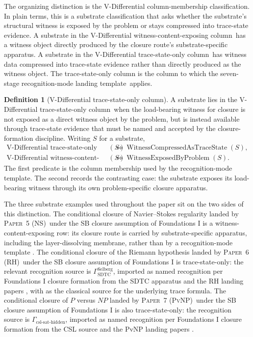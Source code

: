 \documentclass[11pt]{article}
\newcommand{\PaperNS}{\textsc{Paper~5 (NS)}}
\newcommand{\PaperRH}{\textsc{Paper~6 (RH)}}
\newcommand{\PaperPvNP}{\textsc{Paper~7 (PvNP)}}
\newcommand{\VDTSO}{V-Differential trace-state-only column}
\newcommand{\VDWCE}{V-Differential witness-content-exposing column}
\newcommand{\SevenStage}{seven-stage recognition-mode landing template}
\theoremstyle{definition}
\newtheorem{definition}[theorem]{Definition}
\begin{document}
The organizing distinction is the V-Differential column-membership
classification. In plain terms, this is a substrate classification that
asks whether the substrate's structural witness is exposed by the problem
or stays compressed into trace-state evidence. A substrate in the
\VDWCE\ has a witness object directly produced by the closure route's
substrate-specific apparatus. A substrate in the \VDTSO\ has witness data
compressed into trace-state evidence rather than directly produced as the
witness object. The trace-state-only column is the column to which the
\SevenStage\ applies.

\begin{definition}[V-Differential trace-state-only column]\label{def:vdiff-tso-column}
A substrate lies in the \VDTSO\ when the load-bearing witness for closure
is not exposed as a direct witness object by the problem, but is instead
available through trace-state evidence that must be named and accepted by
the closure-formation discipline.
Writing \(S\) for a substrate,
\[
\begin{aligned}
  \mbox{\VDTSO}(S)
    &\Longleftrightarrow
      \operatorname{WitnessCompressedAsTraceState}(S),\\
  \mbox{\VDWCE}(S)
    &\Longleftrightarrow
      \operatorname{WitnessExposedByProblem}(S).
\end{aligned}
\]
The first predicate is the column membership used by the
recognition-mode template.  The second records the contrasting case:
the substrate exposes its load-bearing witness through its own
problem-specific closure apparatus.
\end{definition}

The three substrate examples used throughout the paper sit on the two
sides of this distinction. The conditional closure of Navier--Stokes
regularity landed by \PaperNS\ under the SB closure assumption of
Foundations I is a witness-content-exposing row: its closure route is
carried by substrate-specific apparatus, including the layer-dissolving
membrane, rather than by a recognition-mode template
\cite{Tsiokos2026NavierStokes}. The conditional closure of the Riemann
hypothesis landed by \PaperRH\ under the SB closure assumption of
Foundations I is trace-state-only: the relevant recognition source is
\(\Gamma_{\mathrm{SDTC}}^{\mathrm{Selberg}}\), imported as named
recognition per Foundations I closure formation from the SDTC apparatus
and the RH landing papers \cite{Tsiokos2026SDTC,Tsiokos2026RH}, with
\cite{Selberg1956TraceFormula} as the classical source for the
underlying trace formula. The
conditional closure of \(P\) versus \(NP\) landed by \PaperPvNP\ under the
SB closure assumption of Foundations I is also trace-state-only: the
recognition source is \(\Gamma_{\mathrm{csl\mbox{-}sat\mbox{-}hidden}}\),
imported as named recognition per Foundations I closure formation from
the CSL source and the PvNP landing papers
\cite{Tsiokos2026PvNP,Tsiokos2026CSL}.
\end{document}
